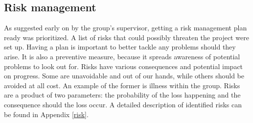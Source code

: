 \subsection{Risk management}
As suggested early on by the group's supervisor, getting a risk management plan ready was prioritized. A list of risks that could possibly threaten the project were set up. Having a plan is important to better tackle any problems should they arise. It is also a preventive measure, because it spreads awareness of potential problems to look out for. Risks have various consequences and potential impact on progress. Some are unavoidable and out of our hands, while others should be avoided at all cost. An example of the former is illness within the group. Risks are a product of two parameters: the probability of the loss happening and the consequence should the loss occur. A detailed description of identified risks can be found in Appendix \ref{risk}.
